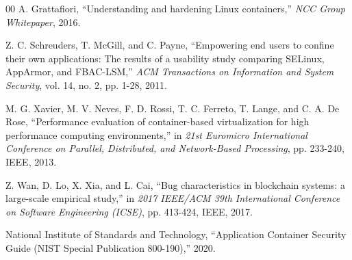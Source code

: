 \documentclass[conference]{IEEEtran}
\begin{document}
\begin{thebibliography}{00}
 A. Grattafiori, ``Understanding and hardening Linux containers,'' \textit{NCC Group Whitepaper}, 2016.

 Z. C. Schreuders, T. McGill, and C. Payne, ``Empowering end users to confine their own applications: The results of a usability study comparing SELinux, AppArmor, and FBAC-LSM,'' \textit{ACM Transactions on Information and System Security}, vol. 14, no. 2, pp. 1-28, 2011.

 M. G. Xavier, M. V. Neves, F. D. Rossi, T. C. Ferreto, T. Lange, and C. A. De Rose, ``Performance evaluation of container-based virtualization for high performance computing environments,'' in \textit{21st Euromicro International Conference on Parallel, Distributed, and Network-Based Processing}, pp. 233-240, IEEE, 2013.

 Z. Wan, D. Lo, X. Xia, and L. Cai, ``Bug characteristics in blockchain systems: a large-scale empirical study,'' in \textit{2017 IEEE/ACM 39th International Conference on Software Engineering (ICSE)}, pp. 413-424, IEEE, 2017.

 National Institute of Standards and Technology, ``Application Container Security Guide (NIST Special Publication 800-190),'' 2020.
\end{thebibliography}
\end{document}
